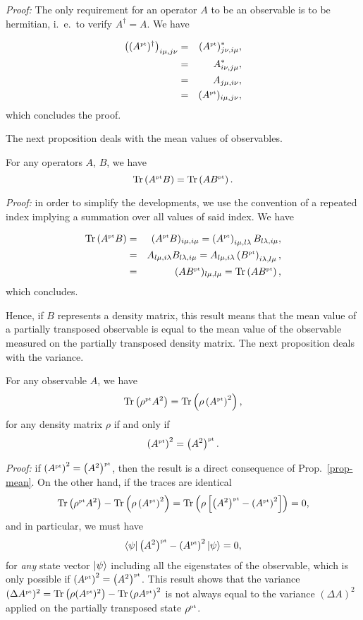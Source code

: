 \emph{Proof: } The only requirement for an operator $A$ to be an observable is to be hermitian, i.~e.~to verify $A^\dagger=A$. We have

\begin{eqnarray}
\left((A^{\mbox{\tiny \textup{pt}}})^\dagger \right)_{i\mu,j\nu}  &=& (A^{\mbox{\tiny \textup{pt}}})_{j\nu,i\mu}^* ,\\
&=& A_{i\nu,j\mu}^* ,\\
&=& A_{j\mu,i\nu} ,\\
&=& (A^{\mbox{\tiny \textup{pt}}})_{i\mu,j\nu},
\end{eqnarray}
which concludes the proof.

The next proposition deals with the mean values of observables.

\begin{prop} \label{prop-mean}
For any operators $A$, $B$, we have
\[ \mbox{\textup{Tr}}\left( A^{\mbox{\tiny \textup{pt}}} B \right) = \mbox{\textup{Tr}}\left(  A B^{\mbox{\tiny \textup{pt}}} \right).\]
\end{prop}

\emph{Proof: } in order to simplify the developments, we use the convention of a repeated index implying a summation over all values of said index. We have

\begin{eqnarray}
\mbox{\textup{Tr}}\left( A^{\mbox{\tiny \textup{pt}}} B \right) &=& (A^{\mbox{\tiny \textup{pt}}} B)_{i\mu,i\mu} = \left( A^{\mbox{\tiny \textup{pt}}}\right)_{i\mu,l\lambda} B_{l\lambda,i\mu} ,\\
&=&  A_{l\mu,i\lambda} B_{l\lambda,i\mu} =  A_{l\mu,i\lambda} \left(B^{\mbox{\tiny \textup{pt}}} \right)_{i\lambda,l\mu}, \\
&=&   (A B^{\mbox{\tiny \textup{pt}}} )_{l\mu,l\mu} =  \mbox{\textup{Tr}}\left( A B^{\mbox{\tiny \textup{pt}}} \right) ,
\end{eqnarray}
which concludes. 

Hence, if $B$ represents a density matrix, this result means that the mean value of a partially transposed observable is equal to the mean value of the observable measured on the partially transposed density matrix. The next proposition deals with the variance.

\begin{prop} \label{prop-rem}
For any observable $A$, we have
\[\mbox{\textup{Tr}}\left( \rho^{\mbox{\tiny \textup{pt}}} A^2 \right) = \mbox{\textup{Tr}}\left(  \rho \left(A^{\mbox{\tiny \textup{pt}}} \right)^2  \right), \]
for any density matrix $\rho$ if and only if
\[\left(A^{\mbox{\tiny \textup{pt}}}\right)^2 = \left(A^2\right)^{\mbox{\tiny \textup{pt}}} .\label{eq-rem}\] 
\end{prop}

\emph{Proof: } if $ \left(A^{\mbox{\tiny \textup{pt}}}\right)^2 =\left(A^2\right)^{\mbox{\tiny \textup{pt}}}$, then the result is a direct consequence of Prop.~\ref{prop-mean}. On the other hand, if the traces are identical
\[ \mbox{\textup{Tr}}\left( \rho^{\mbox{\tiny \textup{pt}}} A^2 \right) - \mbox{\textup{Tr}}\left(  \rho \left(A^{\mbox{\tiny \textup{pt}}} \right)^2  \right) = \mbox{\textup{Tr}}\left(  \rho \left[ \left(A^2\right)^{\mbox{\tiny \textup{pt}}} - \left(A^{\mbox{\tiny \textup{pt}}} \right)^2 \right]  \right) = 0 ,\]
and in particular, we must have
\[ \langle \psi | \left(A^2\right)^{\mbox{\tiny \textup{pt}}} - \left(A^{\mbox{\tiny \textup{pt}}} \right)^2 | \psi \rangle =0,\]
for \emph{any} state vector $| \psi \rangle$ including all the eigenstates of the observable, which is only possible if $\left(A^{\mbox{\tiny \textup{pt}}}\right)^2 = \left(A^2\right)^{\mbox{\tiny \textup{pt}}}$. This result shows that the variance $(\Delta A^{\mbox{\tiny \textup{pt}}})^2=\mbox{\textup{Tr}}\left( \rho (A^{\mbox{\tiny \textup{pt}}})^2 \right)-\mbox{\textup{Tr}}\left( \rho A^{\mbox{\tiny \textup{pt}}} \right)^2$ is not always equal to the variance $(\Delta A)^2$ applied on the partially transposed state $\rho^{\mbox{\tiny \textup{pt}}}$.

